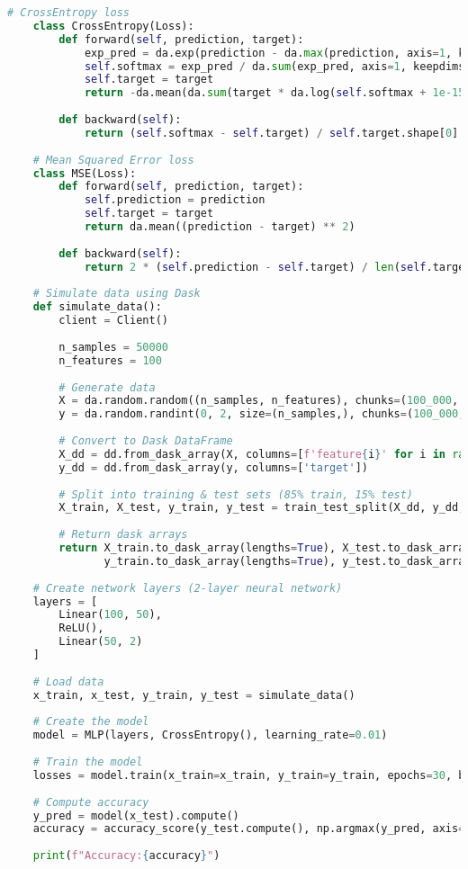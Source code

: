 \documentclass[12pt,letterpaper]{article}
\begin{document}
\begin{lstlisting}[language=Python, frame=single, breaklines=true]
    # CrossEntropy loss
    class CrossEntropy(Loss):
        def forward(self, prediction, target):
            exp_pred = da.exp(prediction - da.max(prediction, axis=1, keepdims=True))
            self.softmax = exp_pred / da.sum(exp_pred, axis=1, keepdims=True)
            self.target = target
            return -da.mean(da.sum(target * da.log(self.softmax + 1e-15), axis=1))
    
        def backward(self):
            return (self.softmax - self.target) / self.target.shape[0]
    
    # Mean Squared Error loss
    class MSE(Loss):
        def forward(self, prediction, target):
            self.prediction = prediction
            self.target = target
            return da.mean((prediction - target) ** 2)
    
        def backward(self):
            return 2 * (self.prediction - self.target) / len(self.target)
    
    # Simulate data using Dask 
    def simulate_data():
        client = Client()  
    
        n_samples = 50000
        n_features = 100
    
        # Generate data 
        X = da.random.random((n_samples, n_features), chunks=(100_000, n_features))
        y = da.random.randint(0, 2, size=(n_samples,), chunks=(100_000,))
    
        # Convert to Dask DataFrame
        X_dd = dd.from_dask_array(X, columns=[f'feature{i}' for i in range(n_features)])
        y_dd = dd.from_dask_array(y, columns=['target'])
    
        # Split into training & test sets (85% train, 15% test)
        X_train, X_test, y_train, y_test = train_test_split(X_dd, y_dd, test_size=0.15, random_state=42)
    
        # Return dask arrays
        return X_train.to_dask_array(lengths=True), X_test.to_dask_array(lengths=True), \
               y_train.to_dask_array(lengths=True), y_test.to_dask_array(lengths=True)
    
    # Create network layers (2-layer neural network)
    layers = [
        Linear(100, 50),
        ReLU(),
        Linear(50, 2)
    ]
    
    # Load data
    x_train, x_test, y_train, y_test = simulate_data()
    
    # Create the model
    model = MLP(layers, CrossEntropy(), learning_rate=0.01)
    
    # Train the model
    losses = model.train(x_train=x_train, y_train=y_train, epochs=30, batch_size=1000)
    
    # Compute accuracy
    y_pred = model(x_test).compute()
    accuracy = accuracy_score(y_test.compute(), np.argmax(y_pred, axis=1))
    
    print(f"Accuracy:{accuracy}")
    
    
\end{lstlisting}
\end{document}
